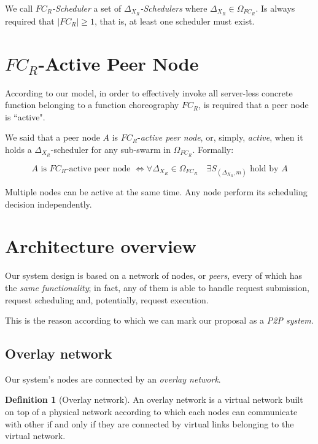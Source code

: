 \documentclass[10pt,a4paper]{article}
\theoremstyle{definition}
\newtheorem{definition}{Definition}[section]
\begin{document}
We call \textit{$FC_R$-Scheduler} a set of \textit{$\Delta_{X_{R}}$-Schedulers} where $\Delta_{X_{R}} \in \Omega_{FC_R}$. Is always required that $|FC_R| \geq 1$, that is, at least one scheduler must exist.

\section{$FC_R$-Active Peer Node}

According to our model, in order to effectively invoke all server-less concrete function belonging to a function choreography $FC_R$, is required that a peer node is ``active".

We said that a peer node $A$ is $FC_R$-\textit{active peer node}, or, simply, \textit{active}, when it holds a $\Delta_{X_{R}}$-scheduler for any sub-swarm in $\Omega_{FC_R}$. Formally:

\begin{equation}
A \text{ is } FC_R\text{-active peer node } \Leftrightarrow \forall \Delta_{X_{R}} \in \Omega_{FC_R} \quad \exists S_{(\Delta_{X_{R}},m)} \text{ hold by } A
\end{equation}

Multiple nodes can be active at the same time. Any node perform its scheduling decision independently.


\section{Architecture overview}

Our system design is based on a network of nodes, or \textit{peers}, every of which has the \textit{same functionality}; in fact, any of them is able to handle request submission, request scheduling and, potentially, request execution. 

This is the reason according to which we can mark our proposal as a \textit{P2P system}.

\subsection{Overlay network}

Our system's nodes are connected by an \textit{overlay network}.

\begin{definition}[Overlay network]
An overlay network is a virtual network built on top of a physical network according to which each nodes can communicate with other if and only if they are connected by virtual links belonging to the virtual network. 
\end{definition}
\end{document}
